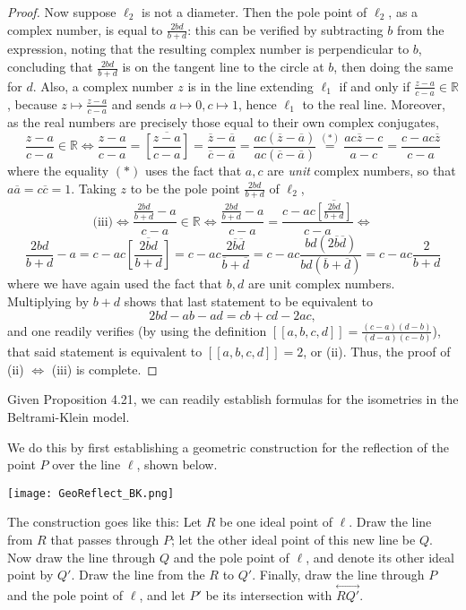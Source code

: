 \documentclass[leqno]{book}
\begin{document}
\begin{proof}
Now suppose $\ell_2$ is not a diameter.  Then the pole point of $\ell_2$, as a complex number, is equal to $\frac{2bd}{b+d}$: this can be verified by subtracting $b$ from the expression, noting that the resulting complex number is perpendicular to $b$, concluding that $\frac{2bd}{b+d}$ is on the tangent line to the circle at $b$, then doing the same for $d$.  Also, a complex number $z$ is in the line extending $\ell_1$ if and only if $\frac{z-a}{c-a}\in\mathbb R$, because $z\mapsto\frac{z-a}{c-a}$ and sends $a\mapsto 0,c\mapsto 1$, hence $\ell_1$ to the real line.  Moreover, as the real numbers are precisely those equal to their own complex conjugates,
$$\frac{z-a}{c-a}\in\mathbb R\iff\frac{z-a}{c-a}=\overline{\left[\frac{z-a}{c-a}\right]}=\frac{\overline z-\overline a}{\overline c-\overline a}=\frac{ac(\overline z-\overline a)}{ac(\overline c-\overline a)}\overset{(*)}=\frac{ac\overline z-c}{a-c}=\frac{c-ac\overline z}{c-a}$$
where the equality $(*)$ uses the fact that $a,c$ are \emph{unit} complex numbers, so that $a\overline a=c\overline c=1$.  Taking $z$ to be the pole point $\frac{2bd}{b+d}$ of $\ell_2$,
$$\text{(iii)}\iff\frac{\frac{2bd}{b+d}-a}{c-a}\in\mathbb R\iff\frac{\frac{2bd}{b+d}-a}{c-a}=\frac{c-ac\overline{\left[\frac{2bd}{b+d}\right]}}{c-a}\iff$$
$$\frac{2bd}{b+d}-a=c-ac\overline{\left[\frac{2bd}{b+d}\right]}=c-ac\frac{2\overline b\overline d}{\overline b+\overline d}=c-ac\frac{bd(2\overline b\overline d)}{bd(\overline b+\overline d)}=c-ac\frac{2}{b+d}$$
where we have again used the fact that $b,d$ are unit complex numbers.  Multiplying by $b+d$ shows that last statement to be equivalent to
$$2bd-ab-ad=cb+cd-2ac,$$
and one readily verifies (by using the definition $[\![a,b,c,d]\!]=\frac{(c-a)(d-b)}{(d-a)(c-b)}$), that said statement is equivalent to $[\![a,b,c,d]\!]=2$, or (ii).  Thus, the proof of (ii) $\iff$ (iii) is complete.
\end{proof}

\noindent Given Proposition 4.21, we can readily establish formulas for the isometries in the Beltrami-Klein model.

We do this by first establishing a geometric construction for the reflection of the point $P$ over the line $\ell$, shown below.
\begin{center}
\texttt{[image: GeoReflect\_BK.png]}
\end{center}
The construction goes like this: Let $R$ be one ideal point of $\ell$.  Draw the line from $R$ that passes through $P$; let the other ideal point of this new line be $Q$.  Now draw the line through $Q$ and the pole point of $\ell$, and denote its other ideal point by $Q'$.  Draw the line from the $R$ to $Q'$.  Finally, draw the line through $P$ and the pole point of $\ell$, and let $P'$ be its intersection with $\overset{\longleftrightarrow}{RQ'}$.
\end{document}
